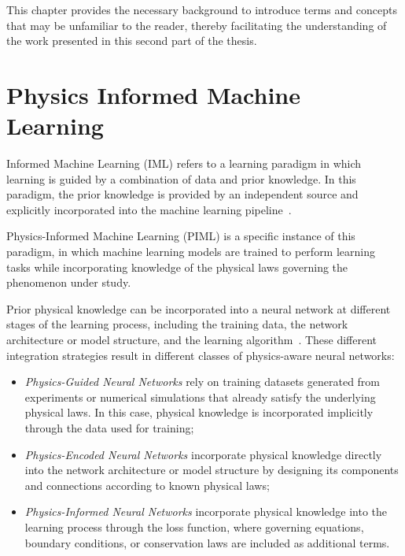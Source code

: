 \label{chap:pt2_background}
This chapter provides the necessary background to introduce terms and concepts that may be unfamiliar to the reader, thereby facilitating the understanding of the work presented in this second part of the thesis.

\section{Physics Informed Machine Learning}

Informed Machine Learning (IML) refers to a learning paradigm in which learning is guided by a combination of data and prior knowledge. In this paradigm, the prior knowledge is provided by an independent source and explicitly incorporated into the machine learning pipeline~\cite{von2021informed}.

Physics-Informed Machine Learning (PIML) is a specific instance of this paradigm, in which machine learning models are trained to perform learning tasks while incorporating knowledge of the physical laws governing the phenomenon under study.

Prior physical knowledge can be incorporated into a neural network at different stages of the learning process, including the training data, the network architecture or model structure, and the learning algorithm~\cite{faroughi2024physics}. These different integration strategies result in different classes of physics-aware neural networks:

\begin{itemize}
	\item \textit{Physics-Guided Neural Networks} rely on training datasets generated from experiments or numerical simulations that already satisfy the underlying physical laws. In this case, physical knowledge is incorporated implicitly through the data used for training;
	
	\item \textit{Physics-Encoded Neural Networks} incorporate physical knowledge directly into the network architecture or model structure by designing its components and connections according to known physical laws;
	
	\item \textit{Physics-Informed Neural Networks} incorporate physical knowledge into the learning process through the loss function, where governing equations, boundary conditions, or conservation laws are included as additional terms.
\end{itemize}


